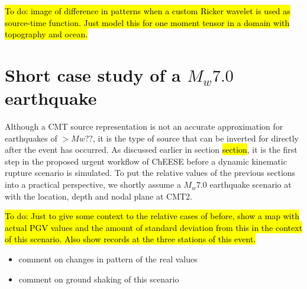 \documentclass[../Text/00main.tex]{subfiles}
\begin{document}
\hl{To do: image of difference in patterns when a custom Ricker wavelet is used as source-time function. Just model this for one moment tensor in a domain with topography and ocean.}


\section{Short case study of a $M_w 7.0$ earthquake}

Although a CMT source representation is not an accurate approximation for earthquakes of $> Mw ??$, it is the type of source that can be inverted for directly after the event has occurred. As discussed earlier in section \hl{section}, it is the first step in the proposed urgent workflow of ChEESE  before a dynamic kinematic rupture scenario is simulated. To put the relative values of the previous sections into a practical perspective, we shortly assume a $M_w 7.0$ earthquake scenario at with the location, depth and nodal plane at CMT2. 

\hl{To do: Just to give some context to the relative cases of before, show a map with actual PGV values and the amount of standard deviation from this in the context of this scenario. Also show records at the three stations of this event.}






\begin{itemize}
    \item comment on changes in pattern of the real values 
    \item comment on ground shaking of this scenario
\end{itemize}
\end{document}

